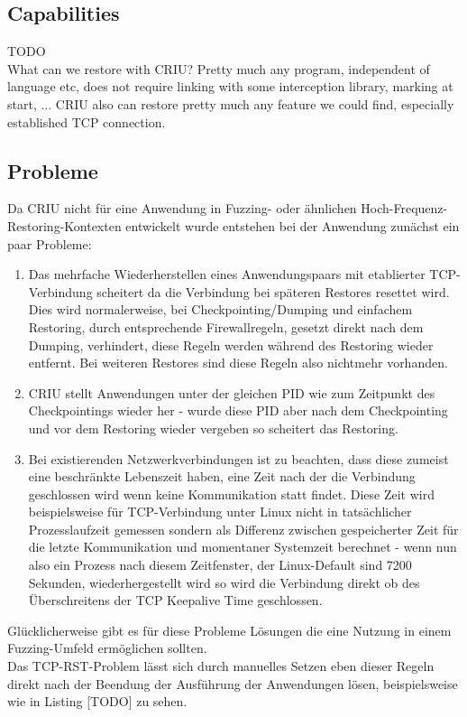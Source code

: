 \documentclass[a4paper]{article}
\begin{document}
\subsection{Capabilities}
TODO\\
What can we restore with CRIU? Pretty much any program, independent of language etc, does not require linking with some interception library, marking at start, ... CRIU also can restore pretty much any feature we could find, especially established TCP connection.
\subsection{Probleme}
Da CRIU nicht für eine Anwendung in Fuzzing- oder ähnlichen Hoch-Frequenz-Restoring-Kontexten entwickelt wurde entstehen bei der Anwendung zunächst ein paar Probleme:
\begin{enumerate}
    \item Das mehrfache Wiederherstellen eines Anwendungspaars mit etablierter TCP-Verbindung scheitert da die Verbindung bei späteren Restores resettet wird. Dies wird normalerweise, bei Checkpointing/Dumping und einfachem Restoring, durch entsprechende Firewallregeln, gesetzt direkt nach dem Dumping, verhindert, diese Regeln werden während des Restoring wieder entfernt. Bei weiteren Restores sind diese Regeln also nichtmehr vorhanden.
    \item CRIU stellt Anwendungen unter der gleichen PID wie zum Zeitpunkt des Checkpointings wieder her - wurde diese PID aber nach dem Checkpointing und vor dem Restoring wieder vergeben so scheitert das Restoring.
    \item Bei existierenden Netzwerkverbindungen ist zu beachten, dass diese zumeist eine beschränkte Lebenszeit haben, eine Zeit nach der die Verbindung geschlossen wird wenn keine Kommunikation statt findet. Diese Zeit wird beispielsweise für TCP-Verbindung unter Linux nicht in tatsächlicher Prozesslaufzeit gemessen sondern als Differenz zwischen gespeicherter Zeit für die letzte Kommunikation und momentaner Systemzeit berechnet - wenn nun also ein Prozess nach diesem Zeitfenster, der Linux-Default sind 7200 Sekunden, wiederhergestellt wird so wird die Verbindung direkt ob des Überschreitens der TCP Keepalive Time geschlossen.
\end{enumerate}
Glücklicherweise gibt es für diese Probleme Lösungen die eine Nutzung in einem Fuzzing-Umfeld ermöglichen sollten.\\
Das TCP-RST-Problem lässt sich durch manuelles Setzen eben dieser Regeln direkt nach der Beendung der Ausführung der Anwendungen lösen, beispielsweise wie in Listing [TODO] zu sehen.
\end{document}
